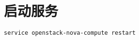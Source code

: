 \documentclass[letterpaper,10pt,english]{sphinxmanual}
\begin{document}
\section{启动服务}
\label{nova_compute:id4}
\begin{Verbatim}[commandchars=\\\{\}]
service openstack-nova-compute restart
\end{Verbatim}



\renewcommand{\indexname}{Index}
\printindex
\end{document}
